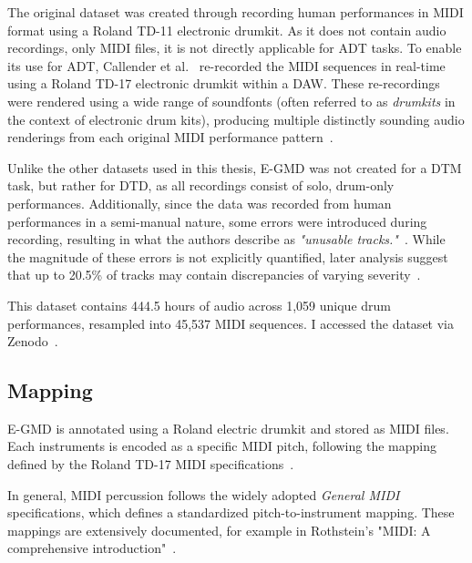The original dataset was created through recording human performances in MIDI format using a Roland TD-11 electronic drumkit. As it does not contain audio recordings, only MIDI files, it is not directly applicable for \gls{ADT} tasks. To enable its use for \gls{ADT}, Callender et al.~\cite{callender2020improvingperceptualqualitydrum} re-recorded the MIDI sequences in real-time using a Roland TD-17 electronic drumkit within a \gls{DAW}. These re-recordings were rendered using a wide range of soundfonts (often referred to as \textit{drumkits} in the context of electronic drum kits), producing multiple distinctly sounding audio renderings from each original MIDI performance pattern~\cite{pmlr-v97-gillick19a, callender2020improvingperceptualqualitydrum}.

Unlike the other datasets used in this thesis, E-GMD was not created for a \gls{DTM} task, but rather for \gls{DTD}, as all recordings consist of solo, drum-only performances. Additionally, since the data was recorded from human performances in a semi-manual nature, some errors were introduced during recording, resulting in what the authors describe as \textit{"unusable tracks."}~\cite{callender2020improvingperceptualqualitydrum}. While the magnitude of these errors is not explicitly quantified, later analysis suggest that up to 20.5\% of tracks may contain discrepancies of varying severity~\cite{holz2021automatic}.

This dataset contains 444.5 hours of audio across 1,059 unique drum performances, resampled into 45,537 MIDI sequences. I accessed the dataset via Zenodo~\cite{callender_2020_4300943, callender2020improvingperceptualqualitydrum}.

\subsection{Mapping}

E-GMD is annotated using a Roland electric drumkit and stored as MIDI files. Each instruments is encoded as a specific MIDI pitch, following the mapping defined by the Roland TD-17 MIDI specifications~\cite{pmlr-v97-gillick19a, callender2020improvingperceptualqualitydrum, roland_drum_midi_td_17}.

In general, MIDI percussion follows the widely adopted \textit{General MIDI} specifications, which defines a standardized pitch-to-instrument mapping. These mappings are extensively documented, for example in Rothstein's "MIDI: A comprehensive introduction"~\cite{rothstein1995midi}.

